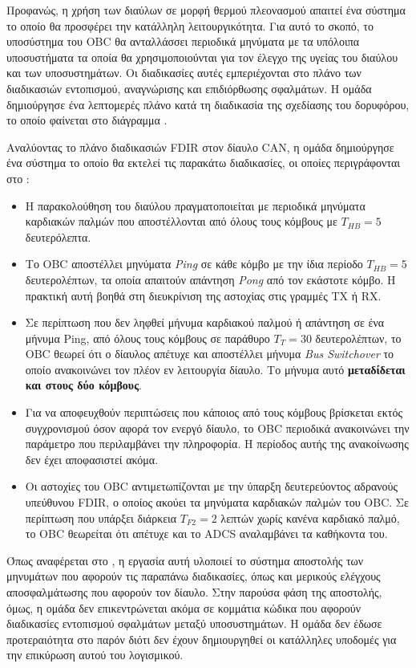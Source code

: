 \documentclass[a4paper,nobib,justified]{tufte-book}
\begin{document}
Προφανώς, η χρήση των διαύλων σε μορφή θερμού πλεονασμού απαιτεί ένα σύστημα το οποίο θα προσφέρει την κατάλληλη λειτουργικότητα. Για αυτό το σκοπό, το υποσύστημα του OBC θα ανταλλάσσει περιοδικά μηνύματα με τα υπόλοιπα υποσυστήματα τα οποία θα χρησιμοποιούνται για τον έλεγχο της υγείας του διαύλου και των υποσυστημάτων. Οι διαδικασίες αυτές εμπεριέχονται στο πλάνο των διαδικασιών εντοπισμού, αναγνώρισης και επιδιόρθωσης σφαλμάτων. Η ομάδα δημιούργησε ένα λεπτομερές πλάνο κατά τη διαδικασία της σχεδίασης του δορυφόρου, το οποίο φαίνεται στο διάγραμμα .

Αναλύοντας το πλάνο διαδικασιών FDIR στον δίαυλο CAN, η ομάδα δημιούργησε ένα σύστημα το οποίο θα εκτελεί τις παρακάτω διαδικασίες, οι οποίες περιγράφονται στο :
\begin{itemize}
	\item Η παρακολούθηση του διαύλου πραγματοποιείται με περιοδικά μηνύματα καρδιακών παλμών που αποστέλλονται από όλους τους κόμβους με $T_{HB} = 5$ δευτερόλεπτα.
	\item Το OBC αποστέλλει μηνύματα \emph{Ping} σε κάθε κόμβο με την ίδια περίοδο $T_{HB} = 5$ δευτερολέπτων, τα οποία απαιτούν απάντηση \emph{Pong} από τον εκάστοτε κόμβο. Η πρακτική αυτή βοηθά στη διευκρίνιση της αστοχίας στις γραμμές TX ή RX.
	\item Σε περίπτωση που δεν ληφθεί μήνυμα καρδιακού παλμού ή απάντηση σε ένα μήνυμα Ping, από όλους τους κόμβους σε παράθυρο $T_T = 30$ δευτερολέπτων, το OBC θεωρεί ότι ο δίαυλος απέτυχε και αποστέλλει μήνυμα \emph{Bus Switchover} το οποίο ανακοινώνει τον πλέον εν λειτουργία δίαυλο. Το μήνυμα αυτό \textbf{μεταδίδεται και στους δύο κόμβους}.
	\item Για να αποφευχθούν περιπτώσεις που κάποιος από τους κόμβους βρίσκεται εκτός συγχρονισμού όσον αφορά τον ενεργό δίαυλο, το OBC περιοδικά ανακοινώνει την παράμετρο που περιλαμβάνει την πληροφορία. Η περίοδος αυτής της ανακοίνωσης δεν έχει αποφασιστεί ακόμα.
	\item Oι αστοχίες του OBC αντιμετωπίζονται με την ύπαρξη δευτερεύοντος αδρανούς	υπεύθυνου FDIR, ο οποίος ακούει τα μηνύματα καρδιακών παλμών του OBC. Σε περίπτωση που υπάρξει διάρκεια $T_{F2} = 2$ λεπτών χωρίς κανένα καρδιακό παλμό, το OBC θεωρείται ότι απέτυχε και το ADCS αναλαμβάνει τα καθήκοντα του.
\end{itemize}

Όπως αναφέρεται στο , η εργασία αυτή υλοποιεί το σύστημα αποστολής των μηνυμάτων που αφορούν τις παραπάνω διαδικασίες, όπως και μερικούς ελέγχους αποσφαλμάτωσης που αφορούν τον δίαυλο. Στην παρούσα φάση της αποστολής, όμως, η ομάδα δεν επικεντρώνεται ακόμα σε κομμάτια κώδικα που αφορούν διαδικασίες εντοπισμού σφαλμάτων μεταξύ υποσυστημάτων. Η ομάδα δεν έδωσε προτεραιότητα στο παρόν διότι δεν έχουν δημιουργηθεί οι κατάλληλες υποδομές για την επικύρωση αυτού του λογισμικού.
\end{document}
